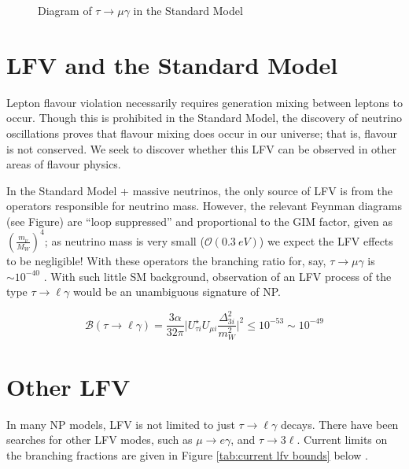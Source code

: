 \documentclass[12pt]{thesis}  %
\newcommand{\tmg}{\tau\to\mu\gamma}
\newcommand{\tlg}{\tau\to\ell\gamma}
\begin{document}
\begin{figure}[h]
\centering
\caption{Diagram of $\tmg$ in the Standard Model}
\label{}
\end{figure}

\section{LFV and the Standard Model}

Lepton flavour violation necessarily requires generation mixing between leptons to occur. Though this is prohibited in the Standard Model, the discovery of neutrino oscillations proves that flavour mixing does occur in our universe; that is, flavour is not conserved. We seek to discover whether this LFV can be observed in other areas of flavour physics.

In the Standard Model + massive neutrinos, the only source of LFV is from the operators responsible for neutrino mass. However, the relevant Feynman diagrams (see Figure) are ``loop suppressed'' and proportional to the GIM factor, given as $\left(\frac{m_\nu}{M_W}\right)^4$; as neutrino mass is very small ($\mathcal{O}(\SI{0.3}{eV})$) we expect the LFV effects to be negligible! With these operators the branching ratio for, say, $\tmg$ is $\sim 10^{-40}$ \cite{Passemar:2015}. With such little SM background, observation of an LFV process of the type $\tlg$ would be an unambiguous signature of NP.

\begin{equation}
\mathcal{B}(\tau\to\ell\gamma)=\frac{3\alpha}{32\pi}\lvert U^{\star}_{\tau i} U_{\mu i}\frac{\Delta^2_{3i}}{m_W^2}\rvert^2
\leq 10^{-53}\sim 10^{-49}
\end{equation}


\section{Other LFV}

In many NP models, LFV is not limited to just $\tlg$ decays. There have been searches for other LFV modes, such as $\mu\to e \gamma$, and $\tau\to 3\ell$. Current limits on the branching fractions are given in Figure \ref{tab:current lfv bounds} below \cite{Paradisi:2016}.
\end{document}
